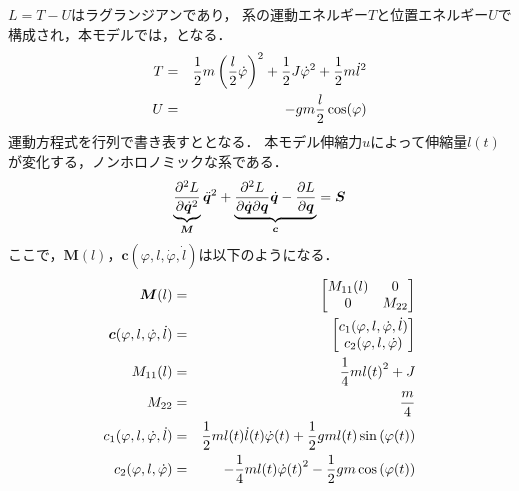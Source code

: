           $L=T-U$はラグランジアンであり，
          系の運動エネルギー$T$と位置エネルギー$U$で構成され，本モデルでは，となる．
          \begin{eqnarray}
              \equlabel{Tequ}
              T &=& \frac{1}{2} m \left(\frac{l}{2} \dot{\varphi} \right)^2 + \frac{1}{2} J \dot{\varphi}^2 + \frac{1}{2} m \dot{l}^2  \\
              \equlabel{U_equ}
              U &=& -gm\frac{l}{2}\cos(\varphi)
              \end{eqnarray}  
          運動方程式を行列で書き表すととなる．
          本モデル伸縮力$u$によって伸縮量$l(t)$が変化する，ノンホロノミックな系である．
          \begin{eqnarray}
            \equlabel{Matrix}
            \underbrace{\frac{\partial^2 L}{\partial \dot{\bm{q}}^2}}_{\bm{M}} \ddot{\bm{q}}^2 +\underbrace{\frac{\partial^2 L}{\partial \dot{\bm{q}} \partial \bm{q}} \dot{\bm{q}} - \frac{\partial L}{\partial \bm{q}}}_{\bm{c}} = \bm{S}
            \end{eqnarray} 
          ここで，$\bm{M}(l)$，$\bm{c}(\varphi,l,\dot{\varphi},\dot{l})$は以下のようになる．
            \begin{eqnarray}
              \equlabel{M}
              \bm{M}(l)&=&
              \begin{bmatrix}
                M_{11}(l) & 0\\
                0 & M_{22} \\
                \end{bmatrix}\\
              \equlabel{C}
              \bm{c}(\varphi,l,\dot{\varphi},\dot{l})&=&
              \begin{bmatrix}
                c_{1}(\varphi,l,\dot{\varphi},\dot{l}) \\
                c_{2}(\varphi,l,\dot{\varphi}) \\
                \end{bmatrix}\\
              \equlabel{M11}
              M_{11}(l) &=& \frac{1}{4}m{l(t)}^2 + J\\
              \equlabel{M22}
              M_{22} &=& \frac{m}{4}\\
              \equlabel{C1}
              c_{1}(\varphi,l,\dot{\varphi},\dot{l}) &=& \frac{1}{2}ml(t)\dot{l}(t)\dot{\varphi}(t) + \frac{1}{2}gml(t)\sin{(\varphi(t))}\\
              \equlabel{C2}
              c_{2}(\varphi,l,\dot{\varphi}) &=& -\frac{1}{4}ml(t){\dot{\varphi}(t)}^2 - \frac{1}{2}gm\cos{(\varphi(t))}
            \end{eqnarray} 
